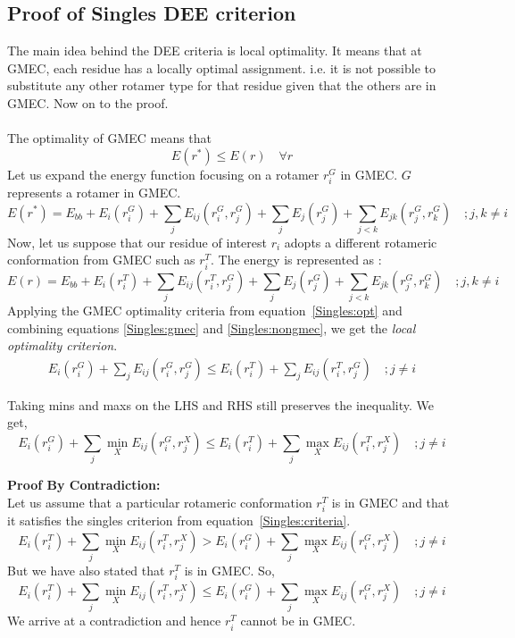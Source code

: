 \documentclass{article}
\begin{document}
\subsection{Proof of Singles DEE criterion}
The main idea behind the DEE criteria is local optimality. It means that at GMEC, each residue has a locally optimal assignment. i.e. it is not possible to substitute any other rotamer type for that residue given that the others are in GMEC. Now on to the proof.
\\
\\
The optimality of GMEC means that 
\begin{equation}
\label{Singles:opt}
E(r^*) \leq E(r) \quad \forall r
\end{equation}
Let us expand the energy function focusing on a rotamer $r_i^G$ in GMEC. $G$ represents a rotamer in GMEC.
\begin{equation}
\label{Singles:gmec}
E(r^*) = E_{bb} + E_i(r_i^G) + \sum_j E_{ij}(r_i^G,r_j^G) + \sum_j E_j(r_j^G) + \sum_{j<k} E_{jk}(r_j^G,r_k^G) \quad ; j,k\neq i
\end{equation}
Now, let us suppose that our residue of interest $r_i$ adopts a different rotameric conformation from  GMEC such as $r_i^T$. The energy is represented as :
\begin{equation}
\label{Singles:nongmec}
E(r) = E_{bb} + E_i(r_i^T) + \sum_j E_{ij}(r_i^T,r_j^G) + \sum_j E_j(r_j^G) + \sum_{j<k} E_{jk}(r_j^G,r_k^G) \quad ; j,k\neq i
\end{equation}
Applying the GMEC optimality criteria from equation~\ref{Singles:opt} and combining equations \ref{Singles:gmec} and \ref{Singles:nongmec}, we get the \emph{local optimality criterion}. 
\begin{align*}
E_i(r_i^G) + \sum_j E_{ij}(r_i^G,r_j^G) \leq E_i(r_i^T) + \sum_j E_{ij}(r_i^T,r_j^G)  \quad   
; j\neq i 
\end{align*}



Taking mins and maxs on the LHS and RHS still preserves the inequality. We get, 
\begin{equation}
E_i(r_i^G) + \sum_j \min_X E_{ij}(r_i^G,r_j^X) \leq E_i(r_i^T) + \sum_j \max_X E_{ij}(r_i^T,r_j^X)  \quad   
; j\neq i 
\end{equation}


\textbf{Proof By Contradiction:}
\\
Let us assume that a particular rotameric conformation $r_i^T$ is in GMEC and that it satisfies the singles criterion from equation~\ref{Singles:criteria}. 
\[
E_i(r_i^T) + \sum_j \min_X E_{ij}(r_i^T,r_j^X) > E_i(r_i^G) + \sum_j \max_X E_{ij}(r_i^G,r_j^X) \quad   
; j\neq i
\]
But we have also stated that $r_i^T$ is in GMEC. So,
\[
E_i(r_i^T) + \sum_j \min_X E_{ij}(r_i^T,r_j^X) \leq E_i(r_i^G) + \sum_j \max_X E_{ij}(r_i^G,r_j^X) \quad   
; j\neq i
\]
We arrive at a contradiction and hence  $r_i^T$ cannot be in GMEC. 
\end{document}
